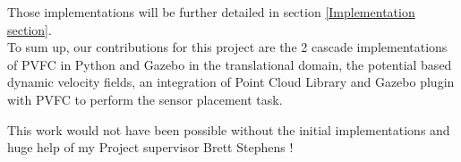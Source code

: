 Those implementations will be further detailed in section \ref{Implementation section}.\\
To sum up, our contributions for this project are the 2 cascade implementations of PVFC in Python and Gazebo in the translational domain, the potential based dynamic velocity fields, an integration of Point Cloud Library and Gazebo plugin with PVFC to perform the sensor placement task.

This work would not have been possible without the initial implementations and huge help of my Project supervisor Brett Stephens ! 

